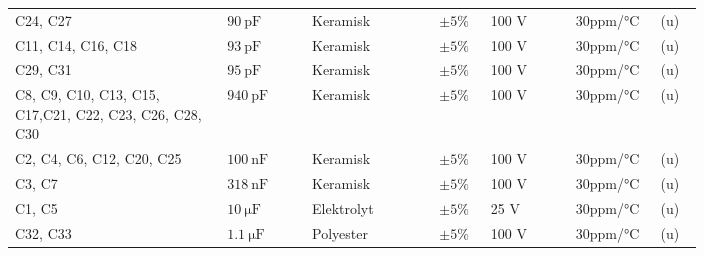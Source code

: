 \begin{table}[h!]
\begin{threeparttable}
\begin{tabular}{p{0.25\linewidth}p{0.1\linewidth}p{0.15\linewidth}p{0.05\linewidth}p{0.1\linewidth}p{0.1\linewidth}p{0.05\linewidth}}
C24, C27 & $\SI{90}{\pico\farad}$ & Keramisk & $\pm 5\%$ & 100 \si{\volt} & 30ppm/\si{\celsius} & (u)\\
C11, C14, C16, C18 & $\SI{93}{\pico\farad}$ & Keramisk & $\pm 5\%$ & 100 \si{\volt} & 30ppm/\si{\celsius} & (u)\\
C29, C31 & $\SI{95}{\pico\farad}$ & Keramisk & $\pm 5\%$ & 100 \si{\volt} & 30ppm/\si{\celsius} & (u)\\
C8, C9, C10, C13, C15, C17,C21, C22, C23, C26, C28, C30 & $\SI{940}{\pico\farad}$ & Keramisk & $\pm 5\%$ & 100 \si{\volt} & 30ppm/\si{\celsius} & (u)\\
C2, C4, C6, C12, C20, C25 & $\SI{100}{\nano\farad}$ & Keramisk & $\pm 5\%$ & 100 \si{\volt} & 30ppm/\si{\celsius} & (u)\\
C3, C7  & $\SI{318}{\nano\farad}$ & Keramisk & $\pm 5\%$ & 100 \si{\volt} & 30ppm/\si{\celsius} & (u)\\
C1, C5 & $\SI{10}{\micro\farad}$ & Elektrolyt & $\pm 5\%$ & 25 \si{\volt} & 30ppm/\si{\celsius} & (u)\\
C32, C33 & $\SI{1.1}{\micro\farad}$ & Polyester & $\pm 5\%$ & 100 \si{\volt} & 30ppm/\si{\celsius} & (u)\\


\end{tabular}
\end{threeparttable}
\end{table}
